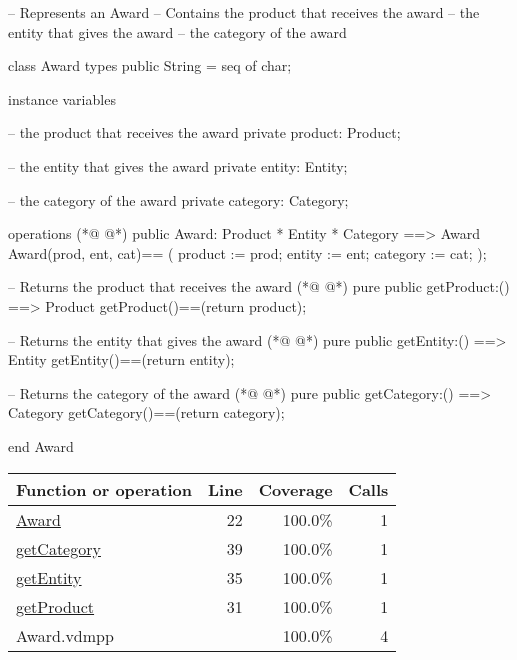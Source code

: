 \begin{vdmpp}[breaklines=true]
-- Represents an Award
-- Contains the product that receives the award
--      the entity that gives the award
--          the category of the award

class Award
 types
    public String = seq of char;

 instance variables
 
   -- the product that receives the award
  private product: Product;
  
   -- the entity that gives the award
  private entity: Entity;
  
   -- the category of the award
  private category: Category;

 operations
(*@
\label{Award:22}
@*)
  public Award: Product * Entity * Category ==> Award
  Award(prod, ent, cat)== 
  (
    product := prod;
    entity := ent;
    category := cat;
  );
  
  -- Returns the product that receives the award
(*@
\label{getProduct:31}
@*)
  pure public getProduct:() ==> Product
     getProduct()==(return product);
     
  -- Returns the entity that gives the award
(*@
\label{getEntity:35}
@*)
   pure public getEntity:() ==> Entity
    getEntity()==(return entity);
   
  -- Returns the category of the award
(*@
\label{getCategory:39}
@*)
   pure public getCategory:() ==> Category
    getCategory()==(return category); 
     

end Award
\end{vdmpp}
\bigskip
\begin{longtable}{|l|r|r|r|}
\hline
Function or operation & Line & Coverage & Calls \\
\hline
\hline
\hyperref[Award:22]{Award} & 22&100.0\% & 1 \\
\hline
\hyperref[getCategory:39]{getCategory} & 39&100.0\% & 1 \\
\hline
\hyperref[getEntity:35]{getEntity} & 35&100.0\% & 1 \\
\hline
\hyperref[getProduct:31]{getProduct} & 31&100.0\% & 1 \\
\hline
\hline
Award.vdmpp & & 100.0\% & 4 \\
\hline
\end{longtable}

